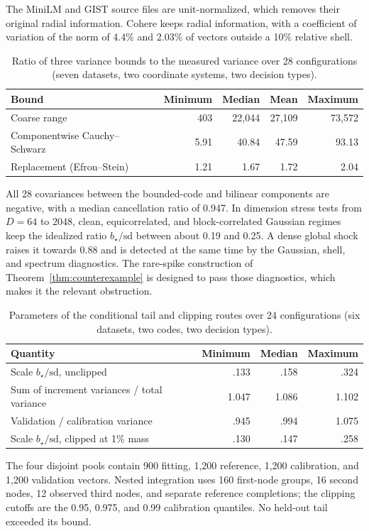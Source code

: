 The MiniLM and GIST source files are unit-normalized, which removes their original radial information. Cohere keeps radial information, with a coefficient of variation of the norm of 4.4\% and 2.03\% of vectors outside a 10\% relative shell.

\begin{table}[tbp]
\centering


\small
\begin{tabular}{lrrrr}
\toprule
Bound & Minimum & Median & Mean & Maximum \\
\midrule
Coarse range & 403 & 22{,}044 & 27{,}109 & 73{,}572 \\
Componentwise Cauchy--Schwarz & 5.91 & 40.84 & 47.59 & 93.13 \\
Replacement (Efron--Stein) & 1.21 & 1.67 & 1.72 & 2.04 \\
\bottomrule
\end{tabular}

\small
\caption{Ratio of three variance bounds to the measured variance over 28 configurations (seven datasets, two coordinate systems, two decision types).}
\label{tab:app-proxies}
\end{table}

All 28 covariances between the bounded-code and bilinear components are negative, with a median cancellation ratio of 0.947. In dimension stress tests from $D=64$ to $2048$, clean, equicorrelated, and block-correlated Gaussian regimes keep the idealized ratio $b_\star/\mathrm{sd}$ between about 0.19 and 0.25. A dense global shock raises it towards 0.88 and is detected at the same time by the Gaussian, shell, and spectrum diagnostics. The rare-spike construction of Theorem~\ref{thm:counterexample} is designed to pass those diagnostics, which makes it the relevant obstruction.

\begin{table}[tbp]
\centering


\small
\begin{tabular}{lrrr}
\toprule
Quantity & Minimum & Median & Maximum \\
\midrule
Scale $b_\star/\mathrm{sd}$, unclipped & .133 & .158 & .324 \\
Sum of increment variances / total variance & 1.047 & 1.086 & 1.102 \\
Validation / calibration variance & .945 & .994 & 1.075 \\
Scale $b_\star/\mathrm{sd}$, clipped at 1\% mass & .130 & .147 & .258 \\
\bottomrule
\end{tabular}

\small
\caption{Parameters of the conditional tail and clipping routes over 24 configurations (six datasets, two codes, two decision types).}
\label{tab:app-cm}
\end{table}

The four disjoint pools contain 900 fitting, 1{,}200 reference, 1{,}200 calibration, and 1{,}200 validation vectors. Nested integration uses 160 first-node groups, 16 second nodes, 12 observed third nodes, and separate reference completions; the clipping cutoffs are the 0.95, 0.975, and 0.99 calibration quantiles. No held-out tail exceeded its bound.
